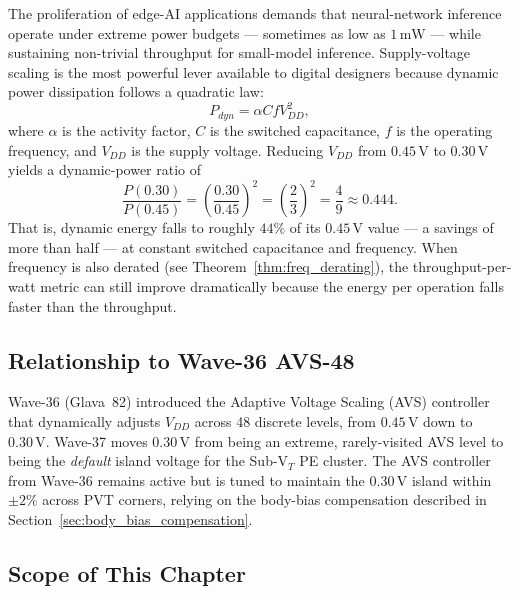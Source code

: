 The proliferation of edge-AI applications demands that neural-network inference operate under
extreme power budgets — sometimes as low as $1\,\text{mW}$ — while sustaining non-trivial
throughput for small-model inference.  Supply-voltage scaling is the most powerful lever
available to digital designers because dynamic power dissipation follows a quadratic law:
\[
  P_{dyn} = \alpha C f V_{DD}^2,
\]
where $\alpha$ is the activity factor, $C$ is the switched capacitance, $f$ is the operating
frequency, and $V_{DD}$ is the supply voltage.  Reducing $V_{DD}$ from $0.45\,\text{V}$ to
$0.30\,\text{V}$ yields a dynamic-power ratio of
\[
  \frac{P(0.30)}{P(0.45)} = \left(\frac{0.30}{0.45}\right)^2 = \left(\frac{2}{3}\right)^2
  = \frac{4}{9} \approx 0.444.
\]
That is, dynamic energy falls to roughly $44\%$ of its $0.45\,\text{V}$ value — a savings of
more than half — at constant switched capacitance and frequency.  When frequency is also
derated (see Theorem~\ref{thm:freq_derating}), the throughput-per-watt metric can still
improve dramatically because the energy per operation falls faster than the throughput.

\subsection{Relationship to Wave-36 AVS-48}

Wave-36 (Glava~82) introduced the Adaptive Voltage Scaling (AVS) controller that dynamically
adjusts $V_{DD}$ across 48 discrete levels, from $0.45\,\text{V}$ down to $0.30\,\text{V}$.
Wave-37 moves $0.30\,\text{V}$ from being an extreme, rarely-visited AVS level to being the
\emph{default} island voltage for the Sub-V$_T$ PE cluster.  The AVS controller from Wave-36
remains active but is tuned to maintain the $0.30\,\text{V}$ island within $\pm 2\%$ across
PVT corners, relying on the body-bias compensation described in
Section~\ref{sec:body_bias_compensation}.

\subsection{Scope of This Chapter}

